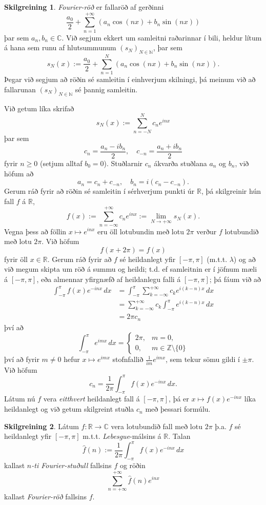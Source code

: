 \documentclass[a4paper,icelandic,11pt]{book}
\theoremstyle{plain}      \newtheorem{setn}{Setning}[chapter]
\theoremstyle{definition} \newtheorem{skilgr}[setn]{Skilgreining}
\theoremstyle{remark}     \newtheorem*{ath}{Athugasemd}
\newcommand{\R}{\mathbb R}
\newcommand{\C}{\mathbb C}
\newcommand{\N}{\mathbb N}
\newcommand{\Z}{\mathbb Z}
\begin{document}
\begin{skilgr}
  \emph{Fourier-röð} er fallaröð af
  gerðinni 
  \[
  \frac{a_{0}}{2} + \sum_{n=1}^{+\infty}(a_{n}\cos(nx)+b_{n}\sin(nx))
  \]
  þar sem $a_{n},b_{n}\in\C$. Við segjum ekkert um samleitni
  raðarinnar í bili, heldur lítum á hana sem runu af hlutsummunum
  $(s_{N})_{N\in\N}$, þar sem 
  \[
  s_{N}(x) :=
  \frac{a_{0}}{2}+\sum_{n=1}^{N}(a_{n}\cos(nx)+b_{n}\sin(nx)).
  \]
  Þegar við segjum að röðin sé samleitin í einhverjum skilningi, þá
  meinum við að fallarunan $(s_{N})_{N\in\N}$ sé þannig samleitin.
\end{skilgr}
Við getum líka skrifað 
\[
s_{N}(x) := \sum_{n=-N}^{N}c_{n}e^{inx}
\]
þar sem 
\[
c_{n} = \frac{a_{n}-ib_{n}}{2},
\quad
c_{-n} = \frac{a_{n}+ib_{n}}{2}
\]
fyrir $n\ge 0$ (setjum alltaf $b_{0}=0$). Stuðlarnir $c_{n}$ ákvarða
stuðlana $a_{n}$ og $b_{n}$, við höfum að 
\[
a_{n} = c_{n} + c_{-n},
\quad
b_{n} = i(c_{n}-c_{-n}).
\]
Gerum ráð fyrir að röðin sé samleitin í sérhverjum punkti úr $\R$, þá
skilgreinir hún fall $f$ á $\R$, 
\[
f(x)
:= \sum_{n=-\infty}^{+\infty}c_{n}e^{inx} 
:= \lim_{N\to +\infty}s_{N}(x).
\]
Vegna þess að föllin $x\mapsto e^{inx}$ eru öll lotubundin með lotu
$2\pi$ verður $f$ lotubundið með lotu $2\pi$. Við höfum
\[
f(x + 2\pi) = f(x)
\]
fyrir öll $x\in\R$. Gerum ráð fyrir að $f$ sé heildanlegt yfir
$[-\pi,\pi]$ (m.t.t. $\lambda$) og að við megum skipta um röð á summu
og heildi; t.d. ef samleitnin er í jöfnum mæli á $[-\pi,\pi]$, eða
almennar yfirgnæfð af heildanlegu falli á $[-\pi,\pi]$; þá fáum við að 
\begin{align*}
  \int_{-\pi}^{\pi}f(x)e^{-inx}\,dx
  &= \int_{-\pi}^{\pi}\sum_{k=-\infty}^{+\infty}c_{k}e^{i(k-n)x}\,dx
  \\
  &= \sum_{k=-\infty}^{+\infty} c_{k}\int_{-\pi}^{\pi}e^{i(k-n)x}\,dx
  \\
  &= 2\pi c_{n}
\end{align*}
því að 
\[
\int_{-\pi}^{\pi}e^{imx}\,dx
=
\begin{cases}
  2\pi, & m = 0,\\
  0, & m\in\Z\setminus\{0\}
\end{cases}
\]
því að fyrir $m\ne 0$ hefur $x\mapsto e^{imx}$ stofnfallið
$\frac{1}{im}e^{imx}$, sem tekur sömu gildi í $\pm\pi$. Við höfum 
\[
c_{n}
= \frac{1}{2\pi}\int_{-\pi}^{\pi}f(x)e^{-inx}\,dx.
\]
Látum nú $f$ vera \emph{eitthvert} heildanlegt fall á $[-\pi,\pi]$, þá
er $x\mapsto f(x)e^{-inx}$ líka heildanlegt og við getum skilgreint
stuðla $c_{n}$ með þessari formúlu.
\begin{skilgr}
  Látum $f:\R\to\C$ vera lotubundið fall með lotu $2\pi$ þ.a. $f$ sé
  heildanlegt yfir $[-\pi,\pi]$ m.t.t. \emph{Lebesgue}-málsins á
  $\R$. Talan 
  \[
  \hat f(n) := \frac{1}{2\pi}\int_{-\pi}^{\pi}f(x)e^{-inx}\,dx
  \]
  kallast \emph{$n$-ti Fourier-stuðull}
  fallsins $f$ og röðin 
  \[
  \sum_{n=+\infty}^{+\infty}\hat f(n)e^{inx}
  \]
  kallast \emph{Fourier-röð} fallsins $f$.
\end{skilgr}
\end{document}
